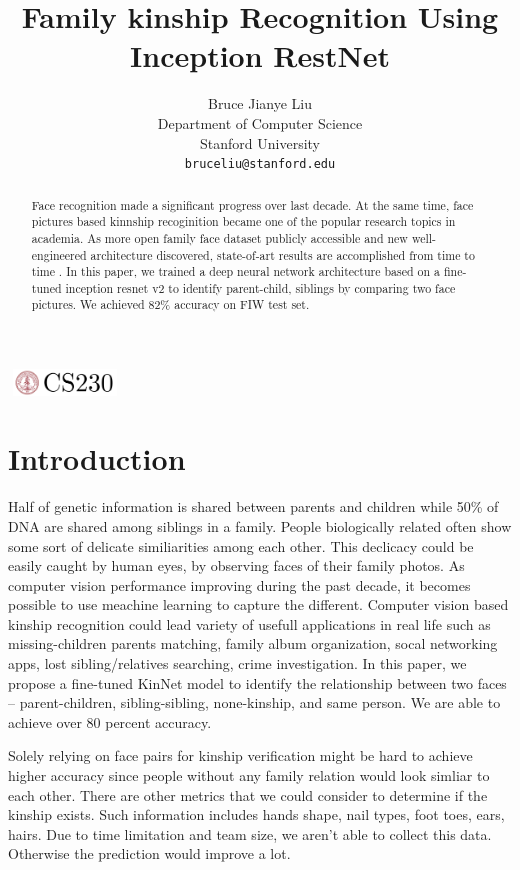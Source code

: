 \documentclass{article}
\title{Family kinship Recognition Using Inception RestNet}
\author{
  Bruce Jianye Liu\\
  Department of Computer Science\\
  Stanford University\\
  \texttt{bruceliu@stanford.edu} \\
}
\begin{document}

\begin{center}
\includegraphics[width=3cm, height=0.7cm]{CS230}
\end{center}

\maketitle

\begin{abstract}
Face recognition made a significant progress over last decade. At the same
time, face pictures based kinnship recoginition became one of the popular
research topics in academia. As more open family face dataset publicly
accessible and new well-engineered architecture discovered, state-of-art
results are accomplished from time to time . In this paper, we trained a
deep neural network architecture based on a fine-tuned inception resnet v2
to identify parent-child, siblings by comparing two face pictures. We
achieved 82\% accuracy on FIW test set.
\end{abstract}

\section{Introduction}

Half of genetic information is shared between parents and children while 50\%
of DNA are shared among siblings in a family. People biologically related often
show some sort of delicate similiarities among each other. This declicacy could
be easily caught by human eyes, by observing faces of their family photos. As
computer vision performance improving during the past decade, it becomes
possible to use meachine learning to capture the different. Computer vision
based kinship recognition could lead variety of usefull applications in real
life such as missing-children parents matching, family album organization,
socal networking apps, lost sibling/relatives searching, crime investigation.
In this paper, we propose a fine-tuned KinNet model to identify the
relationship between two faces -- parent-children, sibling-sibling,
none-kinship, and same person. We are able to achieve over 80 percent accuracy.

Solely relying on face pairs for kinship verification might be hard to achieve
higher accuracy since people without any family relation would look simliar to
each other. There are other metrics that we could consider to determine if the
kinship exists. Such information includes hands shape, nail types, foot toes,
ears, hairs. Due to time limitation and team size, we aren't able to collect
this data. Otherwise the prediction would improve a lot.
\end{document}
